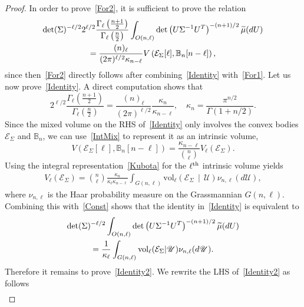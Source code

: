 \documentclass[AHL,Unicode,longabstracts,published]{cedram}
\newcommand{\scU}{\mathscr{U}}
\newcommand{\rvol}{\mathrm{vol}}
\newcommand{\clE}{\mathcal{E}}
\newcommand{\bbB}{\mathbb{B}}
\let\oldtilde\tilde
\renewcommand*{\tilde}[1]{\mathchoice{\widetilde{#1}}{\widetilde{#1}}{\oldtilde{#1}}{\oldtilde{#1}}}
\begin{document}
\begin{proof}
In order to prove~\eqref{For2}, it is sufficient to prove the relation
\begin{multline}\label{Identity}
\det(\Sigma)^{-\ell/2} 2^{\ell/2} \frac{\Gamma_{\ell}\left(\frac{n+1}{2}\right)}{\Gamma_{\ell}\left(\frac{n}{2}\right)}
\int_{O(n,\ell)} \det\left(U\Sigma^{-1}U^T\right)^{-(n+1)/2} \tilde{\mu}(dU)\\
= \frac{(n)_{\ell} }{(2\pi)^{\ell/2} \kappa_{n-\ell}} V\left(\clE_{\Sigma}[\ell],\bbB_n[n-\ell]\right),
\end{multline}
since then~\eqref{For2} directly follows after combining~\eqref{Identity} with~\eqref{For1}. Let us now prove~\eqref{Identity}. A direct computation shows that
\begin{equation}\label{Const}
2^{\ell/2} \frac{\Gamma_{\ell}\left(\frac{n+1}{2}\right)}{\Gamma_{\ell}\left(\frac{n}{2}\right)} = \frac{(n)_{\ell} }{(2\pi)^{\ell/2} } \frac{\kappa_{n}}{\kappa_{n-\ell}}, \quad \kappa_{n}= \frac{\pi^{n/2}}{\Gamma(1+n/2)}.
\end{equation}
Since the mixed volume on the RHS of~\eqref{Identity} only involves the convex bodies $\clE_{\Sigma}$ and $\bbB_n$, we can use~\eqref{IntMix} to represent it as an intrinsic volume,
\begin{equation}\label{RelMI}
V(\clE_{\Sigma}[\ell],\bbB_n[n-\ell]) = \frac{ \kappa_{n-\ell} }{\binom{n}{\ell}} V_{\ell}(\clE_{\Sigma}).
\end{equation}
Using the integral representation~\eqref{Kubota} for the $\ell^{\rm th}$ intrinsic volume yields
\begin{gather*}
V_{\ell}(\clE_{\Sigma}) = \binom{n}{\ell}\frac{\kappa_n}{\kappa_{\ell}\kappa_{n-\ell}}
\int_{G(n,\ell)} \rvol_{\ell}\left(\clE_{\Sigma}\,\middle|\,\scU\right) \nu_{n,\ell}(d\scU),
\end{gather*}
where $\nu_{n,\ell}$ is the Haar probability measure on the Grassmannian $G(n,\ell)$. Combining this with~\eqref{Const} shows that the identity in~\eqref{Identity} is equivalent to
\begin{multline}\label{Identity2}
\det(\Sigma)^{-\ell/2} \int_{O(n,\ell)} \det\left(U\Sigma^{-1}U^T\right)^{-(n+1)/2} \tilde{\mu}(dU)\\ 
= \frac{1}{\kappa_{\ell}} \int_{G(n,\ell)} \rvol_{\ell}(\clE_{\Sigma}|\scU) \nu_{n,\ell}(d\scU).
\end{multline}
Therefore it remains to prove~\eqref{Identity2}. We rewrite the LHS of~\eqref{Identity2} as follows
\begin{gather*}

\end{gather*}
\end{proof}
\end{document}

